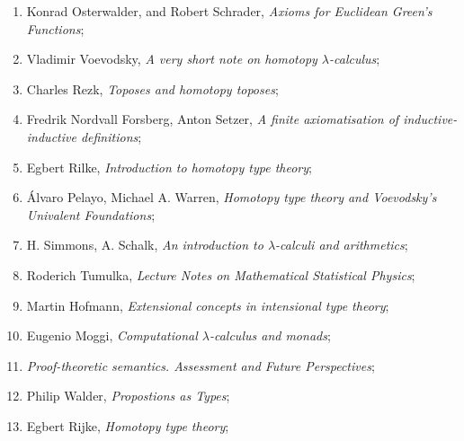 \documentclass[a4paper,11pt]{article}
\begin{document}
\begin{enumerate}
\item Konrad Osterwalder, and Robert Schrader, \textit{Axioms for
    Euclidean Green's Functions};



\item Vladimir Voevodsky, \textit{A very short note on homotopy
    $\lambda$-calculus};



\item Charles Rezk, \textit{Toposes and homotopy toposes};



\item Fredrik Nordvall Forsberg, Anton Setzer, \textit{A finite
    axiomatisation of inductive-inductive definitions};



\item Egbert Rilke, \textit{Introduction to homotopy type theory};



\item \'{A}lvaro Pelayo, Michael A. Warren, \textit{Homotopy type
    theory and Voevodsky’s Univalent Foundations};



\item H. Simmons, A. Schalk, \textit{An introduction to
    $\lambda$-calculi and arithmetics};



\item Roderich Tumulka, \textit{Lecture Notes on Mathematical
    Statistical Physics};



\item Martin Hofmann, \textit{Extensional concepts in intensional type
    theory};



\item Eugenio Moggi, \textit{Computational $\lambda$-calculus and monads};



\item \textit{Proof-theoretic semantics. Assessment and Future
    Perspectives};



\item Philip Walder, \textit{Propostions as Types};



\item Egbert Rijke, \textit{Homotopy type theory};




\end{enumerate}
\end{document}
